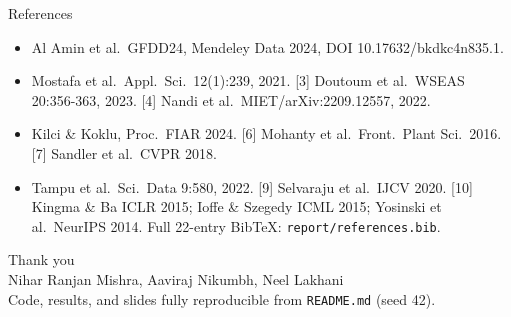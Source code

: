 \documentclass[aspectratio=169]{beamer}
\begin{document}
\begin{frame}{References}
  \footnotesize
  \begin{itemize}
    \item [1] Al Amin et al.\ GFDD24, Mendeley Data 2024, DOI 10.17632/bkdkc4n835.1.
    \item [2] Mostafa et al.\ Appl.\ Sci.\ 12(1):239, 2021. [3] Doutoum et al.\ WSEAS 20:356-363, 2023. [4] Nandi et al.\ MIET/arXiv:2209.12557, 2022.
    \item [5] Kilci \& Koklu, Proc.\ FIAR 2024. [6] Mohanty et al.\ Front.\ Plant Sci.\ 2016. [7] Sandler et al.\ CVPR 2018.
    \item [8] Tampu et al.\ Sci.\ Data 9:580, 2022. [9] Selvaraju et al.\ IJCV 2020. [10] Kingma \& Ba ICLR 2015; Ioffe \& Szegedy ICML 2015; Yosinski et al.\ NeurIPS 2014. Full 22-entry BibTeX: \texttt{report/references.bib}.
  \end{itemize}
\end{frame}
\begin{frame}
  \centering
  {\Large Thank you}\\[1ex]
  Nihar Ranjan Mishra, Aaviraj Nikumbh, Neel Lakhani\\[1ex]
  Code, results, and slides fully reproducible from \texttt{README.md} (seed 42).
\end{frame}
\end{document}
